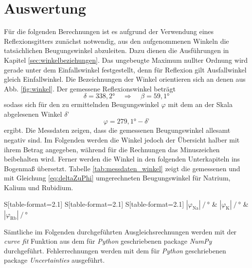 \section{Auswertung}
\label{sec:Auswertung}
Für die folgenden Berechnungen ist es aufgrund der Verwendung eines Reflexionsgitters zunächst notwendig, aus den aufgenommenen Winkeln die tatsächlichen Beugungswinkel abzuleiten. Dazu dienen die Ausführungen in Kapitel \ref{sec:winkelbeziehungen}. Das ungebeugte Maximum nullter Ordnung wird gerade unter dem Einfallswinkel festgestellt, denn für Reflexion gilt Ausfallwinkel gleich Einfallwinkel. Die Bezeichnungen der Winkel orientieren sich an denen aus Abb. \ref{fig:winkel}. Der gemessene Reflexionswinkel beträgt
\begin{equation}
  \delta = 338,2\si{\degree}  \;\;\;\; \Rightarrow \;\;\;\; \beta = 59,1\si{\degree}
\end{equation}
sodass sich für den zu ermittelnden Beugungswinkel $\varphi$ mit dem an der Skala abgelesenen Winkel $\delta$'
\begin{equation}
  \varphi = 279,1\si{\degree} - \delta\text{'}
  \label{eq:deltaZuPhi}
\end{equation}
ergibt. Die Messdaten zeigen, dass die gemessenen Beugungswinkel allesamt negativ sind. Im Folgenden werden die Winkel jedoch der Übersicht halber mit ihrem Betrag angegeben, während für die Rechnungen das Minuszeichen beibehalten wird. Ferner werden die Winkel in den folgenden Unterkapiteln ins Bogenmaß übersetzt. Tabelle \ref{tab:messdaten_winkel} zeigt die gemessenen und mit Gleichung \eqref{eq:deltaZuPhi} umgerechneten Beugungswinkel für Natrium, Kalium und Rubidium.
\begin{table}
  \centering
  \caption{Gemessene und umgerechnete Beugungswinkel von drei verschiedenen Alkali Metallen.}
  \label{tab:messdaten_winkel}
  \begin{tabular}{
    S[table-format=2.1]
    S[table-format=2.1]
    S[table-format=2.1]
  }
    \toprule
    {$|\varphi_\text{Na}| \:/\: \si{\degree}$} & {$|\varphi_\text{K}| \:/\: \si{\degree}$} &
    {$|\varphi_\text{Rb}| \:/\: \si{\degree}$} \\
    \midrule
    
    \bottomrule
  \end{tabular}
\end{table}
Sämtliche im Folgenden durchgeführten Ausgleichsrechnungen werden mit der \emph{curve fit} Funktion aus dem für \emph{Python} geschriebenen package \emph{NumPy}\cite{scipy} durchgeführt. Fehlerrechnungen werden mit dem für \emph{Python} geschriebenen package \emph{Uncertainties}\cite{uncertainties} ausgeführt.


